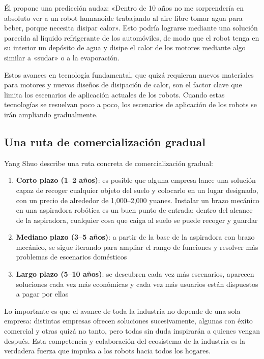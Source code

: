 \documentclass[a4paper]{article}
\begin{document}
Él propone una predicción audaz: «Dentro de 10 años no me sorprendería en absoluto ver a un robot humanoide trabajando al aire libre tomar agua para beber, porque necesita disipar calor». Esto podría lograrse mediante una solución parecida al líquido refrigerante de los automóviles, de modo que el robot tenga en su interior un depósito de agua y disipe el calor de los motores mediante algo similar a «sudar» o a la evaporación.

Estos avances en tecnología fundamental, que quizá requieran nuevos materiales para motores y nuevos diseños de disipación de calor, son el factor clave que limita los escenarios de aplicación actuales de los robots. Cuando estas tecnologías se resuelvan poco a poco, los escenarios de aplicación de los robots se irán ampliando gradualmente.

\subsection{Una ruta de comercialización gradual}

Yang Shuo describe una ruta concreta de comercialización gradual:

\begin{enumerate}
    \item \textbf{Corto plazo (1--2 años)}: es posible que alguna empresa lance una solución capaz de recoger cualquier objeto del suelo y colocarlo en un lugar designado, con un precio de alrededor de 1,000--2,000 yuanes. Instalar un brazo mecánico en una aspiradora robótica es un buen punto de entrada: dentro del alcance de la aspiradora, cualquier cosa que caiga al suelo se puede recoger y guardar
    \item \textbf{Mediano plazo (3--5 años)}: a partir de la base de la aspiradora con brazo mecánico, se sigue iterando para ampliar el rango de funciones y resolver más problemas de escenarios domésticos
    \item \textbf{Largo plazo (5--10 años)}: se descubren cada vez más escenarios, aparecen soluciones cada vez más económicas y cada vez más usuarios están dispuestos a pagar por ellas
\end{enumerate}

Lo importante es que el avance de toda la industria no depende de una sola empresa: distintas empresas ofrecen soluciones sucesivamente, algunas con éxito comercial y otras quizá no tanto, pero todas sin duda inspirarán a quienes vengan después. Esta competencia y colaboración del ecosistema de la industria es la verdadera fuerza que impulsa a los robots hacia todos los hogares.
\end{document}
